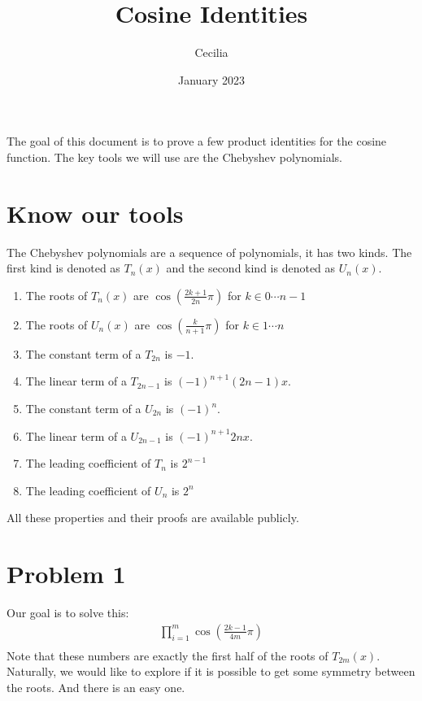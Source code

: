 \documentclass{article}
\title{Cosine Identities}
\author{Cecilia}
\date{January 2023}
\begin{document}
\maketitle
The goal of this document is to prove a few product identities for the cosine function. The key tools we will use are the Chebyshev polynomials.

\section{Know our tools}
The Chebyshev polynomials are a sequence of polynomials, it has two kinds. The first kind is denoted as $ T_n(x) $ and the second kind is denoted as $ U_n(x) $.

\begin{enumerate}
    \item The roots of $ T_n(x) $ are $ \cos\left(\frac{2k + 1}{2n}\pi \right) $ for $ k \in 0 \cdots n - 1 $
    \item The roots of $ U_n(x) $ are $ \cos\left(\frac{k}{n + 1}\pi \right) $ for $ k \in 1 \cdots n $
    \item The constant term of a $ T_{2n} $ is $ -1 $.
    \item The linear term of a $ T_{2n-1} $ is $ (-1)^{n+1} (2n-1)x $.
    \item The constant term of a $ U_{2n} $ is $ (-1)^n $.
    \item The linear term of a $ U_{2n-1} $ is $ (-1)^{n+1} 2nx $.
    
    \item The leading coefficient of $ T_{n} $ is $ 2^{n-1} $
    \item The leading coefficient of $ U_{n} $ is $ 2^n $
\end{enumerate}

All these properties and their proofs are available publicly.

\section{Problem 1}
Our goal is to solve this:
\begin{eqnarray*}
  \prod_{i=1}^{m}{\cos\left(\frac{2k-1}{4m}\pi\right)} \\
\end{eqnarray*}
Note that these numbers are exactly the first half of the roots of $ T_{2m}(x) $. Naturally, we would like to explore if it is possible to get some symmetry between the roots. And there is an easy one.
\end{document}
